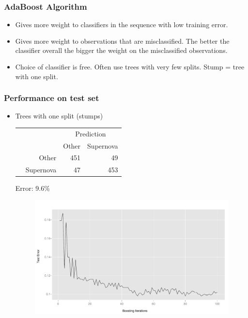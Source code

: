 \documentclass{beamer}
\begin{document}
\begin{frame}
\frametitle{AdaBoost Algorithm}
	\begin{itemize}
		\item Gives more weight to classifiers in the sequence with low training error.	
		\item Gives more weight to observations that are misclassified.  The better the classifier overall the bigger the weight on the misclassified observations.
		\item Choice of classifier is free. Often use trees with very few splits.  Stump = tree with one split.
	\end{itemize}
\end{frame}

\begin{frame}
	\frametitle{Performance on test set}
	\begin{itemize}
		\item Trees with one split (stumps)
		\begin{table}
		\begin{tabular}{cr|rr}
		& & \multicolumn{2}{c}{Prediction}\\
		& & Other & Supernova\\
		\hline
		\multirow{2}{*}{\rotatebox{90}{Actual}} & Other &  451 &  49\\
		& Supernova & 47 &  453\\
		\end{tabular}
		\end{table}
		Error: 9.6\% 
		\begin{figure}
		\includegraphics{error.pdf}
		\end{figure}
			\end{itemize}

\end{frame}
\end{document}
